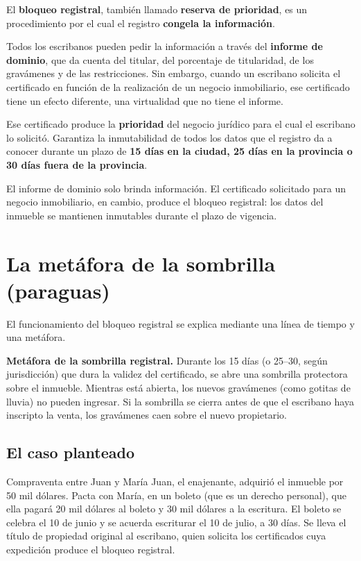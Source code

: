 \documentclass[12pt,oneside]{book}
\begin{document}
El \textbf{bloqueo registral}, también llamado \textbf{reserva de prioridad}, es un procedimiento por el cual el registro \textbf{congela la información}.

Todos los escribanos pueden pedir la información a través del \textbf{informe de dominio}, que da cuenta del titular, del porcentaje de titularidad, de los gravámenes y de las restricciones. Sin embargo, cuando un escribano solicita el certificado en función de la realización de un negocio inmobiliario, ese certificado tiene un efecto diferente, una virtualidad que no tiene el informe.

Ese certificado produce la \textbf{prioridad} del negocio jurídico para el cual el escribano lo solicitó. Garantiza la inmutabilidad de todos los datos que el registro da a conocer durante un plazo de \textbf{15 días en la ciudad, 25 días en la provincia o 30 días fuera de la provincia}.

\begin{important}
El informe de dominio solo brinda información. El certificado solicitado para un negocio inmobiliario, en cambio, produce el bloqueo registral: los datos del inmueble se mantienen inmutables durante el plazo de vigencia.
\end{important}

\section{La metáfora de la sombrilla (paraguas)}

El funcionamiento del bloqueo registral se explica mediante una línea de tiempo y una metáfora.

\begin{note}
\textbf{Metáfora de la sombrilla registral.} Durante los 15 días (o 25--30, según jurisdicción) que dura la validez del certificado, se abre una sombrilla protectora sobre el inmueble. Mientras está abierta, los nuevos gravámenes (como gotitas de lluvia) no pueden ingresar. Si la sombrilla se cierra antes de que el escribano haya inscripto la venta, los gravámenes caen sobre el nuevo propietario.
\end{note}

\subsection{El caso planteado}

\begin{example}{Compraventa entre Juan y María}
Juan, el enajenante, adquirió el inmueble por 50 mil dólares. Pacta con María, en un boleto (que es un derecho personal), que ella pagará 20 mil dólares al boleto y 30 mil dólares a la escritura. El boleto se celebra el 10 de junio y se acuerda escriturar el 10 de julio, a 30 días. Se lleva el título de propiedad original al escribano, quien solicita los certificados cuya expedición produce el bloqueo registral.
\end{example}
\end{document}
